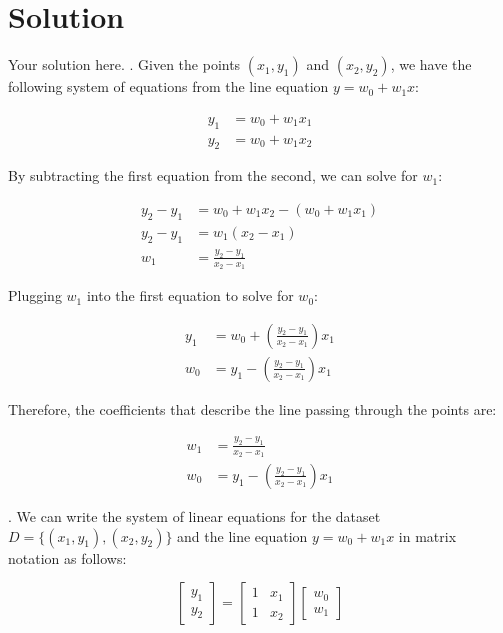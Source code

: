 \documentclass{harvardml}
\theoremstyle{definition}
\theoremstyle{plain}
\newenvironment{solution}
  {\color{blue}\section*{Solution}}
{}
\begin{document}
\begin{solution}
	Your solution here.
 . Given the points $(x_1, y_1)$ and $(x_2, y_2)$, we have the following system of equations from the line equation $y = w_0 + w_1x$:

\begin{align*}
y_1 &= w_0 + w_1x_1 \\
y_2 &= w_0 + w_1x_2
\end{align*}

By subtracting the first equation from the second, we can solve for $w_1$:

\begin{align*}
y_2 - y_1 &= w_0 + w_1x_2 - (w_0 + w_1x_1) \\
y_2 - y_1 &= w_1(x_2 - x_1) \\
w_1 &= \frac{y_2 - y_1}{x_2 - x_1}
\end{align*}

Plugging $w_1$ into the first equation to solve for $w_0$:

\begin{align*}
y_1 &= w_0 + \left(\frac{y_2 - y_1}{x_2 - x_1}\right)x_1 \\
w_0 &= y_1 - \left(\frac{y_2 - y_1}{x_2 - x_1}\right)x_1
\end{align*}

Therefore, the coefficients that describe the line passing through the points are:

\begin{align*}
w_1 &= \frac{y_2 - y_1}{x_2 - x_1} \\
w_0 &= y_1 - \left(\frac{y_2 - y_1}{x_2 - x_1}\right)x_1
\end{align*}

. We can write the system of linear equations for the dataset $D = \{(x_1, y_1), (x_2, y_2)\}$ and the line equation $y = w_0 + w_1x$ in matrix notation as follows:

\[
\begin{bmatrix}
y_1 \\
y_2
\end{bmatrix}
=
\begin{bmatrix}
1 & x_1 \\
1 & x_2
\end{bmatrix}
\begin{bmatrix}
w_0 \\
w_1
\end{bmatrix}
\]


\end{solution}
\end{document}
